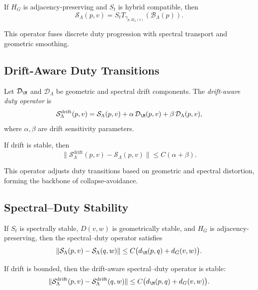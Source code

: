 \begin{lemma}
If $H_G$ is adjacency-preserving and $S_t$ is hybrid compatible, then
\[
\mathcal{S}_\Lambda(p,v)
= S_t T_{\gamma_{p,H_G(v)}}(\mathcal{B}_\Lambda(p)).
\]
\end{lemma}

\begin{remark}
This operator fuses discrete duty progression with spectral transport and
geometric smoothing.
\end{remark}

\subsection{Drift-Aware Duty Transitions}

\begin{definition}
Let $\mathcal{D}_\M$ and $\mathcal{D}_\Lambda$ be geometric and spectral
drift components.  
The \emph{drift-aware duty operator} is
\[
\mathcal{S}^\mathrm{drift}_\Lambda(p,v)
= \mathcal{S}_\Lambda(p,v)
+ \alpha\, \mathcal{D}_\M(p,v)
+ \beta\, \mathcal{D}_\Lambda(p,v),
\]
where $\alpha,\beta$ are drift sensitivity parameters.
\end{definition}

\begin{lemma}
If drift is stable, then
\[
\| \mathcal{S}^\mathrm{drift}_\Lambda(p,v)
    - \mathcal{S}_\Lambda(p,v) \|
\le C (\alpha + \beta).
\]
\end{lemma}

\begin{remark}
This operator adjusts duty transitions based on geometric and spectral
distortion, forming the backbone of collapse-avoidance.
\end{remark}

\subsection{Spectral--Duty Stability}

\begin{theorem}
If $S_t$ is spectrally stable, $D(v,w)$ is geometrically stable, and
$H_G$ is adjacency-preserving, then the spectral--duty operator satisfies
\[
\| \mathcal{S}_\Lambda(p,v) - \mathcal{S}_\Lambda(q,w) \|
\le C \big( d_\M(p,q) + d_G(v,w) \big).
\]
\end{theorem}

\begin{lemma}
If drift is bounded, then the drift-aware spectral--duty operator is
stable:
\[
\| \mathcal{S}^\mathrm{drift}_\Lambda(p,v)
    - \mathcal{S}^\mathrm{drift}_\Lambda(q,w) \|
\le C \big( d_\M(p,q) + d_G(v,w) \big).
\]
\end{lemma}

